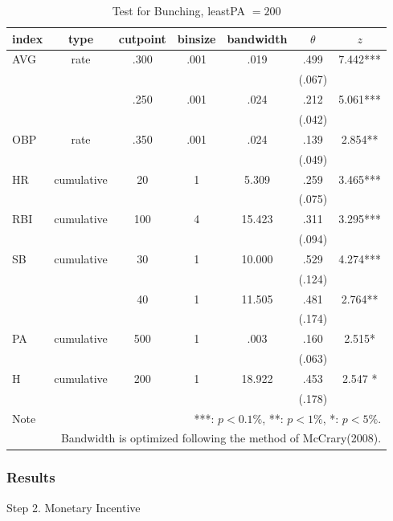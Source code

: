 \documentclass[dvipdfmx,12pt]{beamer}
\begin{document}
\begin{frame}
  \begin{table}
    \tiny
    \centering
    \caption{Test for Bunching, leastPA $= 200$}
    \begin{tabular}{lcccccc}\hline
      index & type & cutpoint & binsize & bandwidth & $\theta$ & $z$
      \\ \hline \hline
      AVG & rate & .300 & .001 & .019 &  .499 & 7.442*** \\
      & & & & & (.067) & \\
      & & .250 & .001 & .024 & .212 & 5.061*** \\
      & & & & & (.042) & \\
      OBP & rate & .350 & .001 & .024 &  .139 & 2.854** \\
      & & & & & (.049) &  \\
      HR & cumulative & 20 & 1 & 5.309 & .259 & 3.465*** \\
      & & & & & (.075)  & \\
      RBI & cumulative & 100 & 4 & 15.423 & .311 & 3.295*** \\
      & & & & & (.094) & \\
      SB & cumulative & 30 & 1 & 10.000 & .529 & 4.274*** \\
      & & & & & (.124) & \\
      & & 40 & 1 & 11.505 & .481 & 2.764** \\
      & & & & & (.174) & \\
      PA & cumulative & 500 & 1 & .003 & .160 & 2.515* \\
      & & & & &(.063) & \\
      H & cumulative & 200 & 1 & 18.922 & .453 & 2.547 * \\
      & & & & & (.178) & \\ \hline \hline
      Note & \multicolumn{6}{r}{
      ***: $p<0.1\%$, **: $p<1\%$, *: $p<5\%$.
      }\\
      \multicolumn{7}{r}{
      Bandwidth is optimized following the method of McCrary(2008).
      }
    \end{tabular}
    \label{Bunch-True}
  \end{table}
\end{frame}

\begin{frame}\frametitle{Results}
  \large
  Step 2. Monetary Incentive
\end{frame}

\begin{frame}\frametitle{}
  
\end{frame}
\end{document}
